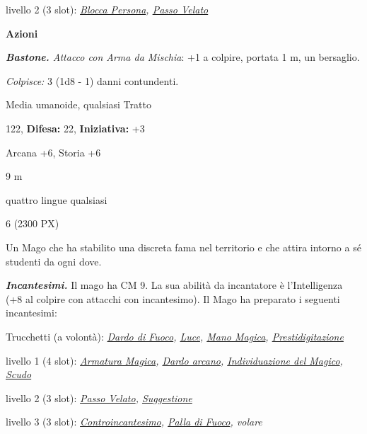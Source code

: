 \begin{multicols}{2}
{livello 2 (3 slot): \emph{\hyperlink{Blocca Persona}{Blocca Persona}, \hyperlink{Passo Velato}{Passo Velato}}

\textbf{Azioni}

\emph{\textbf{Bastone.} Attacco con Arma da Mischia}: +1 a colpire, portata 1 m, un bersaglio.

\emph{Colpisce:} 3 (1d8 - 1) danni contundenti.

\begin{description}[noitemsep, topsep=0pt, parsep=0pt, partopsep=0pt, leftmargin=0cm, labelwidth=2.2cm]
    \item[\textbf{Taglia/Tipo:}] Media umanoide, qualsiasi Tratto
    \item[\textbf{Caratt.:}] 
    \item[\textbf{Punti Ferita:}] 122,  \textbf{Difesa:} 22,  \textbf{Iniziativa:} +3
    \item[\textbf{Comp.:}] Arcana +6, Storia +6
    \item[\textbf{Tiri Salvez.:}] 
    \item[\textbf{Movimento:}] 9 m
    \item[\textbf{Linguaggi:}] quattro lingue qualsiasi
    \item[\textbf{Sfida:}] 6 (2300 PX)\smallskip
\end{description}

Un Mago che ha stabilito una discreta fama nel territorio e che attira intorno a sé studenti da ogni dove.

\emph{\textbf{Incantesimi.}} Il mago ha CM 9. La sua abilità da incantatore è l'Intelligenza (+8 al colpire con attacchi con incantesimo). Il Mago ha preparato i seguenti incantesimi:

Trucchetti (a volontà): \emph{\hyperlink{Dardo di Fuoco}{Dardo di Fuoco}, \hyperlink{Luce}{Luce}, \hyperlink{Mano Magica}{Mano Magica}, \hyperlink{Prestidigitazione}{Prestidigitazione}}

livello 1 (4 slot): \emph{\hyperlink{Armatura Magica}{Armatura Magica}, \hyperlink{Dardo arcano}{Dardo arcano}, \hyperlink{Individuazione del Magico}{Individuazione del Magico}, \hyperlink{Scudo}{Scudo}}

livello 2 (3 slot): \emph{\hyperlink{Passo Velato}{Passo Velato}, \hyperlink{Suggestione}{Suggestione}}

livello 3 (3 slot): \emph{\hyperlink{Controincantesimo}{Controincantesimo}, \hyperlink{Palla di Fuoco}{Palla di Fuoco}, volare}

}
\end{multicols}
